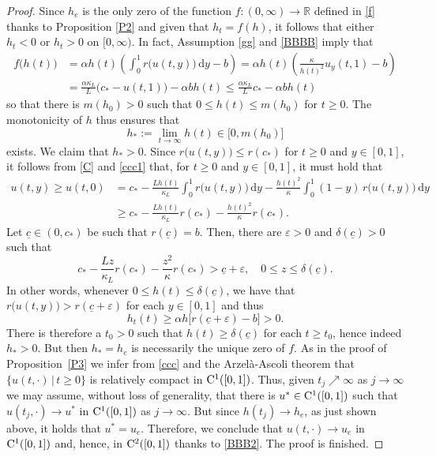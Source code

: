 \documentclass[reqno,11pt]{amsart}
\numberwithin{equation}{section}
\newcommand{\ve}{\varepsilon}
\newcommand{\rd}{\mathrm{d}}
\begin{document}
\begin{proof}
 Since $h_e$ is the only zero of the function $f:(0,\infty)\to
 \mathbb{R}$ defined in \eqref{f} thanks to Proposition \ref{P2} and
 given that $h_t=f(h)$, it follows that either $h_t<0$ or
 $h_t>0$ on $[0,\infty)$. In fact, Assumption \eqref{gg} and
 \eqref{BBBB} imply that
\begin{align*}
f\bigl(h(t)\bigr)&=\alpha h(t)\left(\int_0^1r\big(u(t,y)\big)\,\rd
y-b\right)=\alpha h(t)\left(\frac{\kappa}{h(t)^2}u_y(t,1)-b\right)\\
&=\frac{\alpha\kappa_L}{L}\Big(c_*-u(t,1)\Big)-\alpha bh(t)\leq
\frac{\alpha\kappa_L}{L} c_* -\alpha bh(t)
\end{align*}
so that there is $m(h_0)>0$ such that $0\leq h(t)\le m(h_0)$ for $t\geq
0$. The monotonicity of $h$ thus ensures that 
$$
h_*:=\lim_{t\to\infty} h(t) \in \bigl[0, m(h_0)\bigr]
$$
exists. We claim that $h_*>0$. Since $r\bigl(u(t,y)\bigr)\leq r(c_*)$
for $t\ge 0$ and $y\in [0,1]$, it follows from \eqref{C} and
\eqref{ccc1} that, for $t\geq 0$ and $y\in [0,1]$, it must hold that
\begin{align*}
u(t,y)\ge u(t,0)&=c_*-\frac{Lh(t)}{\kappa_L}\int_0^1 r\bigl(
u(t,y)\bigr)\,\rd y 
-\frac{h(t)^2}{\kappa} \int_0^1 (1-y)\, r\bigl(u(t,y)\bigr)\,\rd y\\
&\geq c_*- \frac{Lh(t)}{\kappa_L}r(c_*)- \frac{h(t)^2}{\kappa}r(c_*).
\end{align*}
Let $\underline{c}\in (0,c_*)$ be such that
$r(\underline{c})=b$. Then, there are $\ve>0$ and
$\delta(\underline{c})>0$ such that 
$$
c_*- \frac{L z}{\kappa_L}r(c_*)-\frac{z^2}{\kappa}r(c_*)>
\underline{c}+\ve,\quad 0\leq z\leq \delta(\underline{c}).
$$
In other words, whenever $0\leq h(t)\le \delta(\underline{c})$, we
have that $r\bigl(u(t,y)\bigr)>r(\underline{c}+\ve)$ for each $y\in
[0,1]$ and thus
$$
h_t(t)\geq \alpha  h\big[r(\underline{c}+\ve)-b\big]>0.
$$
There is therefore a $t_0>0$ such that $h(t)\geq\delta(\underline{c})$
for each $t\geq t_0$, hence indeed $h_*>0$. But then $h_*=h_e$ is
necessarily the unique zero of $f$. As in the proof of Proposition~\ref{P3} we infer from \eqref{ccc} and the Arzel\`a-Ascoli theorem
that $\big\{u(t,\cdot)\, \big |\, t\geq 0\big\}$ is relatively compact
in ${\rm C}^1([0,1])$. Thus, given $t_j\nearrow\infty$ as
$j\to\infty$ we may assume, without loss of generality, that there is $u^*\in
{\rm C}^1([0,1])$ such that $u(t_j,\cdot)\to u^*$ in
${\rm C}^1([0,1])$ as $j\to\infty$. But since $h(t_j)\to
h_e$, as just shown above, it holds that $u^*=u_e$. Therefore,  we
conclude that $u(t,\cdot)\to u_e$ in~${\rm C}^1([0,1])$ and,
hence, in ${\rm C}^2([0,1])$ thanks to \eqref{BBB2}. The
proof is finished.
\end{proof}
\end{document}
